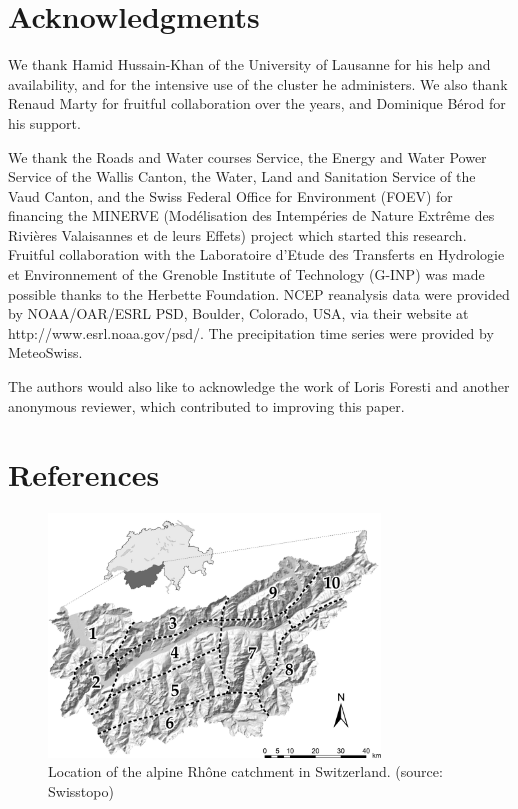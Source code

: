 \documentclass[review]{elsarticle}
\begin{document}
\section*{Acknowledgments}
We thank Hamid Hussain-Khan of the University of Lausanne for his help and availability, and for the intensive use of the cluster he administers. We also thank Renaud Marty for fruitful collaboration over the years, and Dominique B\'{e}rod for his support.

We thank the Roads and Water courses Service, the Energy and Water Power Service of the Wallis Canton, the Water, Land and Sanitation Service of the Vaud Canton, and the Swiss Federal Office for Environment (FOEV) for financing the MINERVE (Mod\'{e}lisation des Intemp\'{e}ries de Nature Extr\^{e}me des Rivi\`{e}res Valaisannes et de leurs Effets) project which started this research. Fruitful collaboration with the Laboratoire d'Etude des Transferts en Hydrologie et Environnement of the Grenoble Institute of Technology (G-INP) was made possible thanks to the Herbette Foundation. NCEP reanalysis data were provided by NOAA/OAR/ESRL PSD, Boulder, Colorado, USA, via their website at http://www.esrl.noaa.gov/psd/. The precipitation time series were provided by MeteoSwiss. 

The authors would also like to acknowledge the work of Loris Foresti and another anonymous reviewer, which contributed to improving this paper. 

\section*{References}

%


\clearpage


\begin{figure}[t]
	\centerline{\includegraphics[width=8.8cm]{figures/fig01.pdf}}
	\caption{Location of the alpine Rh\^{o}ne catchment in Switzerland. (source: Swisstopo)}
	\label{fig:map}
\end{figure}
\end{document}
